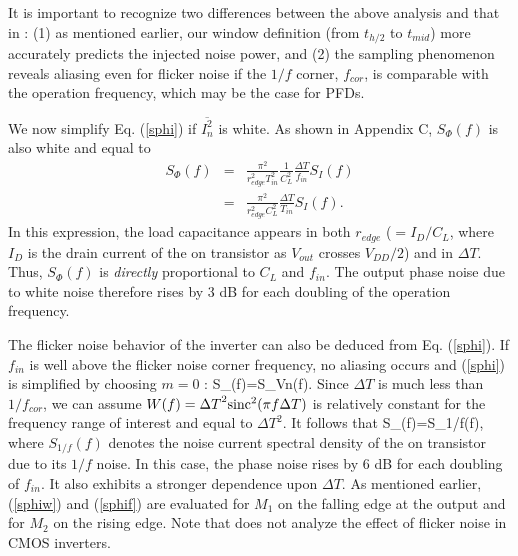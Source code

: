 It is important to recognize two differences between the above analysis and that in \cite{Abidi}: (1) as mentioned earlier, our window definition
(from $t_{h/2}$ to $t_{mid}$) more accurately predicts the injected noise power, and (2) the sampling phenomenon reveals aliasing even for flicker
noise if the $1/f$ corner, $f_{cor}$, is comparable with the operation frequency, which may be the case for PFDs.

We now simplify Eq. (\ref{sphi}) if $\overline{I_n^2}$ is white. As shown in Appendix C, $S_{\Phi}(f)$ is also white and equal to 
\begin{eqnarray}
S_{\Phi}(f)&=&\frac{\pi^2}{r_{edge}^2 T_{in}^2}\frac{1}{C_L^2}\frac{\Delta T}{f_{in}}S_I(f) \nonumber \\ &=&\frac{\pi^2}{r_{edge}^2 C_L^2} \frac{\Delta T}{T_{in}} S_I(f).
\label{sphiw}
\end{eqnarray}
In this expression, the load capacitance appears in both $r_{edge}$ ($=I_D/C_L$, where $I_D$ is the drain current of the on transistor as $V_{out}$
crosses $V_{DD}/2$) and in $\Delta T$. Thus, $S_{\Phi}(f)$ is {\em directly} proportional to $C_L$ and $f_{in}$. The output phase noise due to white
noise therefore rises by 3 dB for each doubling of the operation frequency.

The flicker noise behavior of the inverter can also be deduced from Eq. (\ref{sphi}). If $f_{in}$ is well above the flicker noise corner
frequency, no aliasing occurs and (\ref{sphi}) is simplified by choosing $m=0$ :
\beq
S_{\Phi}(f)=S_{Vn}(f).
\label{sphina}
\eeq
Since $\Delta T$ is much less than $1/f_{cor}$, we can assume $W(f)={\Delta T}^2 {\rm sinc}^2(\pi f \Delta T)$ is relatively constant for the frequency
range of interest and equal to ${\Delta T}^2$. It follows that
\beq
S_{\Phi}(f)=S_{1/f}(f),
\label{sphif}
\eeq
where $S_{1/f}(f)$ denotes the noise current spectral density of the on transistor due to its $1/f$ noise. In this case, the phase noise rises by 6
dB for each doubling of $f_{in}$. It also exhibits a stronger dependence upon $\Delta T$. As mentioned earlier, (\ref{sphiw}) and (\ref{sphif}) are
evaluated for $M_1$ on the falling edge at the output and for $M_2$ on the rising edge.
Note that \cite{Abidi} does not analyze the effect of flicker noise in CMOS inverters.

